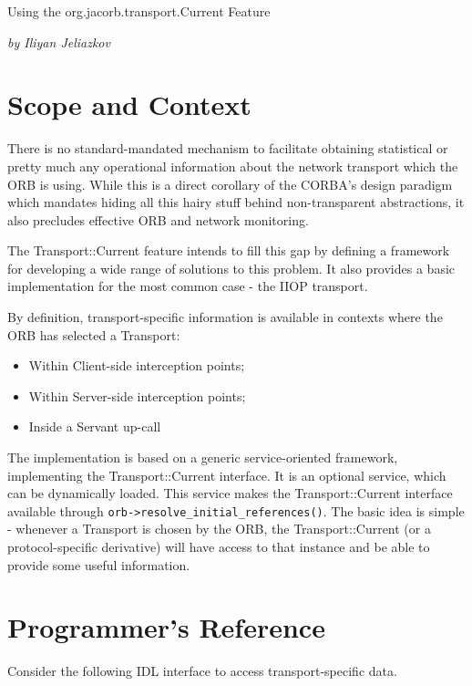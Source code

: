 %
%

Using the org.jacorb.transport.Current Feature

\emph{by Iliyan Jeliazkov}

\section{Scope and Context}

There is no standard-mandated mechanism to facilitate obtaining statistical or pretty
much any operational information about the network transport which the ORB is using.
While this is a direct corollary of the CORBA's design paradigm which mandates hiding
all this hairy stuff behind non-transparent abstractions, it also precludes effective
ORB and network monitoring.

The Transport::Current feature intends to fill this gap by defining a framework
for developing a wide range of solutions to this problem. It also provides a basic
implementation for the most common case - the IIOP transport.

By definition, transport-specific information is available in contexts where the
ORB has selected a Transport:

\begin{itemize}
\item Within Client-side interception points;
\item Within Server-side interception points;
\item Inside a Servant up-call
\end{itemize}

The implementation is based on a generic service-oriented framework, implementing
the Transport::Current interface. It is an optional service, which can be dynamically
loaded. This service makes the Transport::Current interface available through
{\tt orb->resolve\_initial\_references()}. The basic idea is simple - whenever a Transport
is chosen by the ORB, the Transport::Current (or a protocol-specific derivative)
will have access to that instance and be able to provide some useful information.



\section{Programmer's Reference}

Consider the following IDL interface to access transport-specific data.

